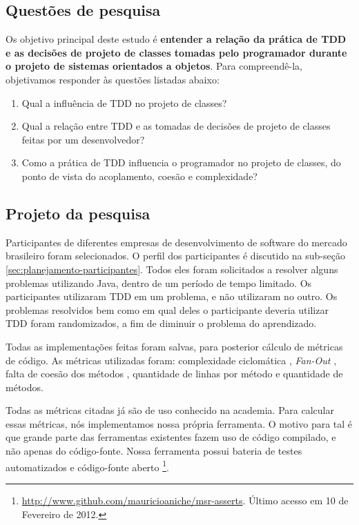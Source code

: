 \documentclass[conference]{IEEEtran}
\begin{document}
\subsection{Questões de pesquisa}

Os objetivo principal deste estudo é \textbf{entender a relação da prática de TDD 
e as decisões de projeto de classes tomadas pelo programador durante o 
projeto de sistemas orientados a objetos}.
Para compreendê-la, objetivamos responder às questões listadas
abaixo:

\begin{enumerate}

	\item Qual a influência de TDD no projeto de classes?

	\item Qual a relação entre TDD e as tomadas de decisões de projeto de classes
	feitas por um desenvolvedor?

	\item Como a prática de TDD influencia o programador no 
	projeto de classes, do ponto de vista do acoplamento, coesão e complexidade?

\end{enumerate}

\subsection{Projeto da pesquisa}

Participantes de diferentes empresas de desenvolvimento de software do mercado
brasileiro foram selecionados. O perfil dos participantes é 
discutido na sub-seção \ref{sec:planejamento-participantes}. 
Todos eles foram solicitados a resolver 
alguns problemas utilizando Java, dentro de um período de tempo limitado. 
Os participantes utilizaram TDD em um problema, e não utilizaram
no outro. Os problemas resolvidos bem como em qual deles o participante
deveria utilizar TDD foram randomizados, a fim de diminuir o problema do aprendizado.

Todas as implementações feitas foram salvas, para posterior
cálculo de métricas de código. 
As métricas utilizadas foram: complexidade ciclomática \cite{mccabe}, \textit{Fan-Out} \cite{lorenz},
falta de coesão dos métodos \cite{lcom-hs}, quantidade de linhas por método e quantidade de métodos.

Todas as métricas citadas já são de uso conhecido na academia. Para calcular essas
métricas, nós implementamos nossa própria ferramenta. O motivo para tal é que
grande parte das ferramentas existentes fazem uso de código compilado, e não
apenas do código-fonte. Nossa ferramenta possui bateria de testes automatizados
e código-fonte aberto \footnote{\url{http://www.github.com/mauricioaniche/msr-asserts}. 
Último acesso em 10 de Fevereiro de 2012.}.
\end{document}
